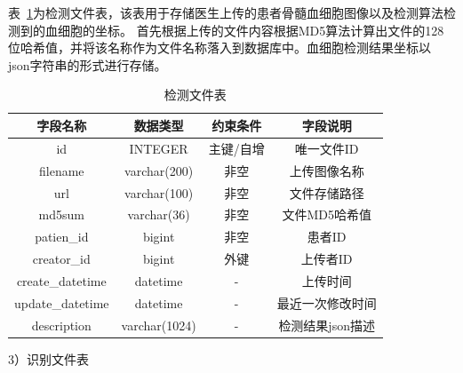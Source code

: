表~\ref{table:detect_table}为检测文件表，该表用于存储医生上传的患者骨髓血细胞图像以及检测算法检测到的血细胞的坐标。
首先根据上传的文件内容根据MD5算法计算出文件的128位哈希值，并将该名称作为文件名称落入到数据库中。血细胞检测结果坐标以
json字符串的形式进行存储。
\begin{table}
    \caption{检测文件表}   
    \centering 
    \label{table:detect_table}
    \begin{tabular*}{0.9\hsize}{@{}@{\extracolsep{\fill}}cccc@{}}
      \toprule[1pt]
      字段名称  &  数据类型 & 约束条件 & 字段说明 \\
      \midrule[1pt] 
      id           & INTEGER      & 主键/自增    & 唯一文件ID   \\ 
      filename     & varchar(200) & 非空         & 上传图像名称   \\ 
      url          & varchar(100) & 非空         & 文件存储路径   \\ 
      md5sum       & varchar(36)  & 非空         & 文件MD5哈希值 \\
      patien\_id   & bigint       & 非空         & 患者ID  \\ 
      creator\_id  & bigint       & 外键         & 上传者ID  \\ 
      create\_datetime & datetime & -    & 上传时间 \\
      update\_datetime & datetime & -    & 最近一次修改时间 \\
      description      & varchar(1024) & - & 检测结果json描述 \\
      \bottomrule[1pt]      
    \end{tabular*} 
  \end{table}
3）识别文件表

